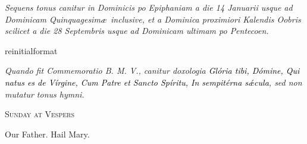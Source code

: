 \documentclass[12pt]{article} %
\newcommand{\myaboveinitial}[1]{%
    \expandafter\renewcommand\csname greinitialformat\endcsname[1]{%
        \fontsize{43}{43}\selectfont ##1
    }
    \gresetfirstlineaboveinitial{\textcolor{benred8}{\raisebox{6.0mm}{\small \textsc{\textbf{#1}}}}}{}
}
\newenvironment{rubric}{\vspace{2 mm}\color{benred8} \itshape \leftskip 0in \setlength{\parindent}{0.25in}}{\vspace{2 mm}}
\begin{document}
\begin{pages}
\begin{Leftside}
\pend\pstart

\begin{rubric}
Sequens tonus canitur in Dominicis po Epiphaniam a die 14 Januarii usque ad Dominicam Quinquagesim\ae\ inclusive, et a Dominica proximiori Kalendis Oobris scilicet a die 28 Septembris usque ad Dominicam ultimam po Pentecoen.

\end{rubric}

\pend\pstart


\myaboveinitial{IV}

\pend\pstart

\begin{rubric}
Quando fit Commemoratio B. M. V., canitur doxologia \emph{\textcolor{black}{Gl\'{o}ria tibi, D\'{o}mine, Qui natus es de V\'{i}rgine, Cum Patre \emph{et} Sancto Sp\'{i}ritu, In sempit\'{e}rna s\'{\ae}cula}}, sed non mutatur tonus hymni.

\end{rubric}

\pend\endnumbering
\end{Leftside}
\begin{Rightside}

\beginnumbering\pstart




\begin{center}\begin{Huge}\textsc{\textcolor{benred8}{Sunday at Vespers}}\end{Huge}\end{center}

\pend\pstart

\begin{center}Our Father. Hail Mary.\end{center}

\pend\pstart



\def\greinitialformat#1{%
{\fontsize{43}{43}\selectfont #1}%
}


\end{Rightside}
\end{pages}
\end{document}
